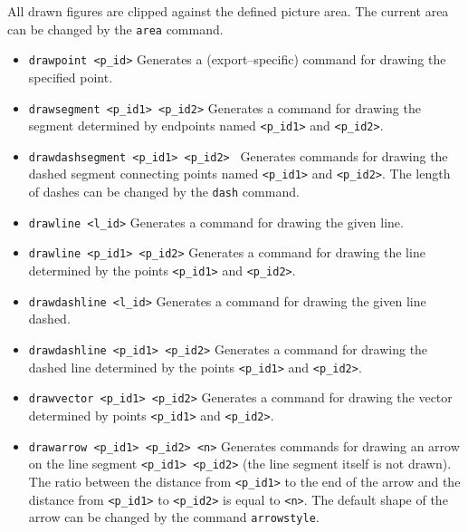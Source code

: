 \documentclass[a4paper]{book}
\begin{document}
All drawn figures are clipped against the defined picture area.
The current area can be changed by the \verb|area| command.

\begin{itemize}
\item \verb|drawpoint <p_id>|
        Generates a (export--specific) command for drawing the
        specified point.

\item \verb|drawsegment <p_id1> <p_id2>|
        Generates a command for drawing the segment determined by
        endpoints named \verb|<p_id1>| and \verb|<p_id2>|.

\item \verb|drawdashsegment <p_id1> <p_id2> |
        Generates commands for drawing the dashed segment connecting
        points named \verb|<p_id1>| and \verb|<p_id2>|.
        The length of dashes can be changed by the \verb|dash| command.

\item \verb|drawline <l_id>|
        Generates a command for drawing the given line.

\item \verb|drawline <p_id1> <p_id2>|
        Generates a command for drawing the line determined by
        the points \verb|<p_id1>| and \verb|<p_id2>|.

\item \verb|drawdashline <l_id>|
        Generates a command for drawing the given line dashed.

\item \verb|drawdashline <p_id1> <p_id2>|
        Generates a command for drawing the dashed line determined
        by the points \verb|<p_id1>| and \verb|<p_id2>|.

\item  \verb|drawvector <p_id1> <p_id2>|
        Generates a command for drawing the vector determined
        by points \verb|<p_id1>| and \verb|<p_id2>|.

\item \verb|drawarrow <p_id1> <p_id2> <n>|
        Generates commands for drawing an arrow on the line segment
        \verb|<p_id1> <p_id2>| (the line segment itself is not drawn).
        The ratio between the distance from \verb|<p_id1>| to the end of the
        arrow and the distance from \verb|<p_id1>| to \verb|<p_id2>| is
        equal to \verb|<n>|. The default shape of the arrow can be changed
        by the command \verb|arrowstyle|.



\end{itemize}
\end{document}

